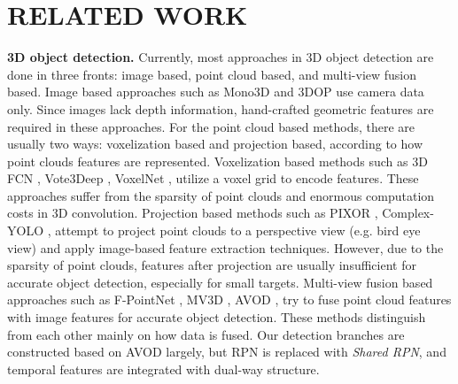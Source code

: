 \documentclass[letterpaper, 10pt, conference]{ieeeconf}  %
\begin{document}
\section{RELATED WORK}

\textbf{3D object detection.} Currently, most approaches in 3D object detection are done in three fronts: image based, point cloud based, and multi-view fusion based. Image based approaches such as Mono3D \cite{7780605} and 3DOP \cite{chen20183d} use camera data only. Since images lack depth information, hand-crafted geometric features are required in these approaches. For the point cloud based methods, there are usually two ways: voxelization based and projection based, according to how point clouds features are represented. Voxelization based methods such as 3D FCN \cite{li20173d}, Vote3Deep \cite{engelcke2017vote3deep}, VoxelNet \cite{zhou2018voxelnet}, utilize a voxel grid to encode features. These approaches suffer from the sparsity of point clouds and enormous computation costs in 3D convolution. Projection based methods such as PIXOR \cite{yang2018pixor}, Complex-YOLO \cite{simon2018complex, Simon_2019_CVPR_Workshops}, attempt to project point clouds to a perspective view (e.g. bird eye view) and apply image-based feature extraction techniques. However, due to the sparsity of point clouds, features after projection are usually insufficient for accurate object detection, especially for small targets. Multi-view fusion based approaches such as F-PointNet \cite{qi2018frustum}, MV3D \cite{chen2017multi}, AVOD \cite{ku2018joint}, try to fuse point cloud features with image features for accurate object detection. These methods distinguish from each other mainly on how data is fused. Our detection branches are constructed based on AVOD largely, but RPN is replaced with \textit{Shared RPN}, and temporal features are integrated with dual-way structure.
\end{document}
